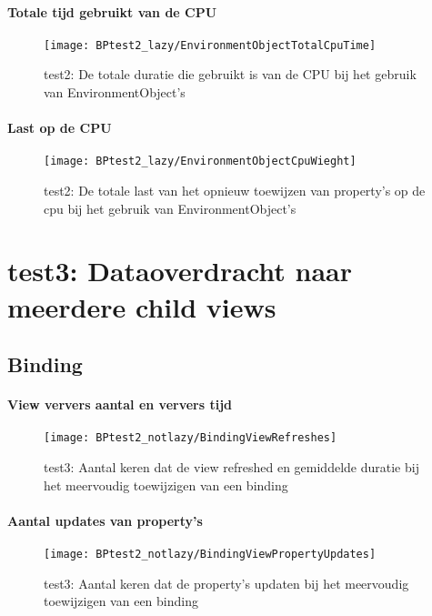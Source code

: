 \paragraph{Totale tijd gebruikt van de CPU}
\begin{figure}[H]
    \centering
    \texttt{[image: BPtest2\_lazy/EnvironmentObjectTotalCpuTime]} 
    \caption{test2: De totale duratie die gebruikt is van de CPU bij het gebruik van EnvironmentObject's}
    \label{fig:cpuUsageTimeEnvironmentObject2}
\end{figure}
\paragraph{Last op de CPU}
\begin{figure}[H]
    \centering
    \texttt{[image: BPtest2\_lazy/EnvironmentObjectCpuWieght]} 
    \caption{test2: De totale last van het opnieuw toewijzen van property's op de cpu bij het gebruik van EnvironmentObject's}
    \label{fig:cpuWeightEnvironmentObject2}
\end{figure}

\section{test3: Dataoverdracht naar meerdere child views}
\subsection{Binding}
\paragraph{View ververs aantal en ververs tijd}
\begin{figure}[H]
    \centering
    \texttt{[image: BPtest2\_notlazy/BindingViewRefreshes]} 
    \caption{test3: Aantal keren dat de view refreshed en gemiddelde duratie bij het meervoudig toewijzigen van een binding}
    \label{fig:viewRefreshesBinding3}
\end{figure}
\paragraph{Aantal updates van property's}
\begin{figure}[H]
    \centering
    \texttt{[image: BPtest2\_notlazy/BindingViewPropertyUpdates]} 
    \caption{test3: Aantal keren dat de property's updaten bij het meervoudig toewijzigen van een binding}
    \label{fig:propertyUpdatesBinding3}
\end{figure}

